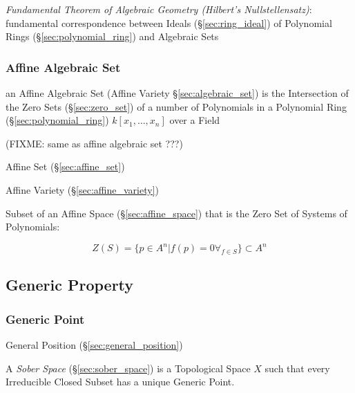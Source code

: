 \emph{Fundamental Theorem of Algebraic Geometry (Hilbert's Nullstellensatz)}:
fundamental correspondence between Ideals (\S\ref{sec:ring_ideal}) of Polynomial
Rings (\S\ref{sec:polynomial_ring}) and Algebraic Sets



\subsubsection{Affine Algebraic Set}\label{sec:affine_algebraic_set}

an Affine Algebraic Set (Affine Variety \S\ref{sec:algebraic_set}) is the
Intersection of the Zero Sets (\S\ref{sec:zero_set}) of a number of Polynomials
in a Polynomial Ring (\S\ref{sec:polynomial_ring}) $k[x_1,\ldots,x_n]$ over a
Field

(FIXME: same as affine algebraic set ???)


Affine Set (\S\ref{sec:affine_set})

Affine Variety (\S\ref{sec:affine_variety})

Subset of an Affine Space (\S\ref{sec:affine_space}) that is the Zero Set of
Systems of Polynomials:

\[
  Z(S) = \{ p \in A^n | f(p) = 0 \forall_{f \in S} \} \subset A^n
\]



\subsection{Generic Property}\label{sec:generic_property}

\subsubsection{Generic Point}\label{sec:generic_point}

\fist General Position (\S\ref{sec:general_position})

\fist A \emph{Sober Space} (\S\ref{sec:sober_space}) is a Topological Space $X$
such that every Irreducible Closed Subset has a unique Generic Point.



